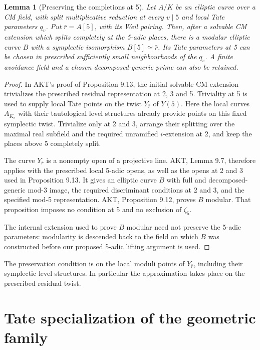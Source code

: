 \documentclass[11pt,a4paper]{article}
\newtheorem{lemma}[theorem]{Lemma}
\theoremstyle{definition}\newtheorem{definition}[theorem]{Definition}
\theoremstyle{remark}\newtheorem*{remark}{Remark}
\begin{document}
\begin{lemma}[Preserving the completions at 5]\label{lem:seed}
Let $A/K$ be an elliptic curve over a CM field, with split multiplicative
reduction at every $v\mid5$ and local Tate parameters $q_v$.
Put $\bar r=A[5]$, with its Weil pairing. Then, after a solvable CM extension which
splits completely at the 5-adic places, there is a modular elliptic curve
$B$ with a symplectic isomorphism $B[5]\simeq\bar r$.
Its Tate parameters at 5 can be chosen in
prescribed sufficiently small neighbourhoods of the $q_v$. A finite
avoidance field and a chosen decomposed-generic prime can also be retained.
\end{lemma}
\begin{proof}
In AKT's proof of Proposition 9.13, the initial solvable CM extension
trivializes the prescribed residual representation at 2, 3 and 5. Triviality
at 5 is used to supply local Tate points on the twist $Y_{\bar r}$ of
$Y(5)$. Here the local curves $A_{K_v}$ with their tautological level
structures already provide points on this fixed symplectic twist.
Trivialize only at 2 and 3,
arrange their splitting over the maximal real subfield and the required
unramified $i$-extension at 2, and keep the places above 5 completely split.

The curve $Y_{\bar r}$ is a nonempty open of a projective line. AKT,
Lemma 9.7, therefore applies with the prescribed local 5-adic opens, as
well as the opens at 2 and 3 used in Proposition 9.13. It gives an elliptic
curve $B$ with full and decomposed-generic mod-3 image, the required
discriminant conditions at 2 and 3, and the specified mod-5 representation.
AKT, Proposition 9.12, proves $B$ modular. That proposition imposes no
condition at 5 and no exclusion of $\zeta_5$.

The internal extension used to prove $B$ modular need not preserve the
5-adic parameters: modularity is descended back to the field on which
$B$ was constructed before our proposed 5-adic lifting argument is used.
\end{proof}

The preservation condition is on the local moduli points of
$Y_{\bar r}$, including their symplectic level structures. In particular
the approximation takes place on the prescribed residual twist.

\section{Tate specialization of the geometric family}\label{sec:tategeometry}
\label{sec:geometry}
\end{document}
